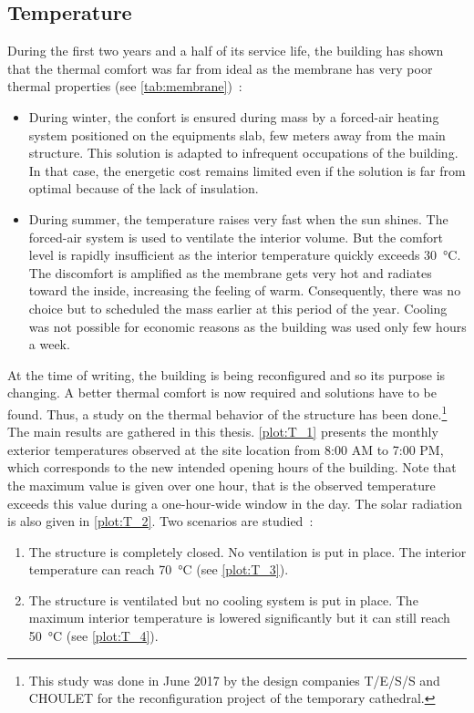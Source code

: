 \subsection{Temperature}\label{sec:temperature}
During the first two years and a half of its service life, the building has shown that the thermal comfort was far from ideal as the membrane has very poor thermal properties (see \cref{tab:membrane})~:
\begin{itemize}
\item During winter, the confort is ensured during mass by a forced-air heating system positioned on the equipments slab, few meters away from the main structure. This solution is adapted to infrequent occupations of the building. In that case, the energetic cost remains limited even if the solution is far from optimal because of the lack of insulation.
\item During summer, the temperature raises very fast when the sun shines. The forced-air system is used to ventilate the interior volume. But the comfort level is rapidly insufficient as the interior temperature quickly exceeds \SI{30}{\celsius}. The discomfort is amplified as the membrane gets very hot and radiates toward the inside, increasing the feeling of warm. Consequently, there was no choice but to scheduled the mass earlier at this period of the year. Cooling was not possible for economic reasons as the building was used only few hours a week.
\end{itemize}

At the time of writing, the building is being reconfigured and so its purpose is changing. A better thermal comfort is now required and solutions have to be found. Thus, a study on the thermal behavior of the structure has been done.\footnote{This study was done in June 2017 by the design companies T/E/S/S and CHOULET for the reconfiguration project of the temporary cathedral.} The main results are gathered in this thesis. \cref{plot:T_1} presents the monthly exterior temperatures observed at the site location from 8:00 AM to 7:00 PM, which corresponds to the new intended opening hours of the building. Note that the maximum value is given over one hour, that is the observed temperature exceeds this value during a one-hour-wide window in the day. The solar radiation is also given in \cref{plot:T_2}. Two scenarios are studied~:
\begin{enumerate}
\item The structure is completely closed. No ventilation is put in place. The interior temperature can reach \SI{70}{\celsius} (see \cref{plot:T_3}).
\item The structure is ventilated but no cooling system is put in place. The maximum interior temperature is lowered significantly but it can still reach \SI{50}{\celsius} (see \cref{plot:T_4}).
\end{enumerate}

